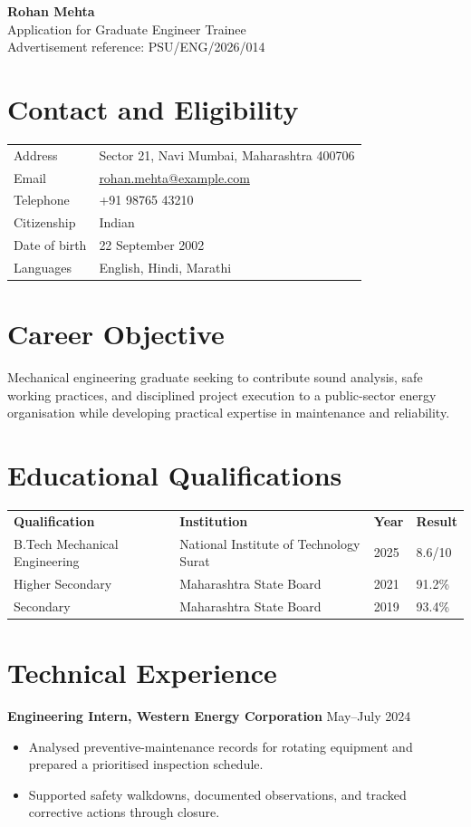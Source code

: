 \documentclass[11pt,a4paper]{article}
\begin{document}
\begin{center}
  {\LARGE\textbf{Rohan Mehta}}\\[3pt]
  Application for Graduate Engineer Trainee\\[2pt]
  Advertisement reference: PSU/ENG/2026/014
\end{center}

\section{Contact and Eligibility}
\begin{tabular}{@{}p{}p{}@{}}
Address & Sector 21, Navi Mumbai, Maharashtra 400706 \\
Email & \href{mailto:rohan.mehta@example.com}{rohan.mehta@example.com} \\
Telephone & +91 98765 43210 \\
Citizenship & Indian \\
Date of birth & 22 September 2002 \\
Languages & English, Hindi, Marathi \\
\end{tabular}

\section{Career Objective}
Mechanical engineering graduate seeking to contribute sound analysis, safe
working practices, and disciplined project execution to a public-sector energy
organisation while developing practical expertise in maintenance and reliability.

\section{Educational Qualifications}
\begin{tabular}{@{}p{}p{}p{}p{}@{}}
\textbf{Qualification} & \textbf{Institution} & \textbf{Year} & \textbf{Result} \\
B.Tech Mechanical Engineering & National Institute of Technology Surat & 2025 & 8.6/10 \\
Higher Secondary & Maharashtra State Board & 2021 & 91.2\% \\
Secondary & Maharashtra State Board & 2019 & 93.4\% \\
\end{tabular}

\section{Technical Experience}
\textbf{Engineering Intern, Western Energy Corporation} \hfill May--July 2024
\begin{itemize}
  \item Analysed preventive-maintenance records for rotating equipment and prepared a prioritised inspection schedule.
  \item Supported safety walkdowns, documented observations, and tracked corrective actions through closure.
\end{itemize}
\end{document}
